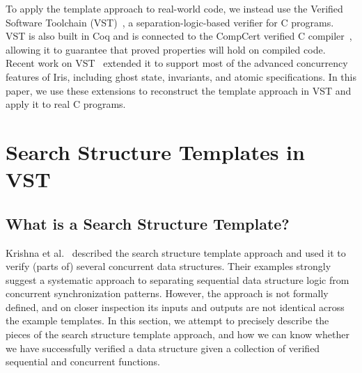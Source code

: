 \documentclass[sigplan,10pt, screen]{acmart}
\begin{document}
To apply the template approach to real-world code, we instead use the Verified Software Toolchain (VST)~\cite{plcc}, a separation-logic-based verifier for C programs. VST is also built in Coq and is connected to the CompCert verified C compiler~\cite{compcert}, allowing it to guarantee that proved properties will hold on compiled code. Recent work on VST~\cite{iris-vst-arxiv} extended it to support most of the advanced concurrency features of Iris, including ghost state, invariants, and atomic specifications. In this paper, we use these extensions to reconstruct the template approach in VST and apply it to real C programs. %

\section{Search Structure Templates in VST}

\subsection{What is a Search Structure Template?}
Krishna et al.~\cite{templates} described the search structure template approach and used it to verify (parts of) several concurrent data structures. Their examples strongly suggest a systematic approach to separating sequential data structure logic from concurrent synchronization patterns. However, the approach is not formally defined, and on closer inspection its inputs and outputs are not identical across the example templates. In this section, we attempt to precisely describe the pieces of the search structure template approach, and how we can know whether we have successfully verified a data structure given a collection of verified sequential and concurrent functions.
\end{document}

